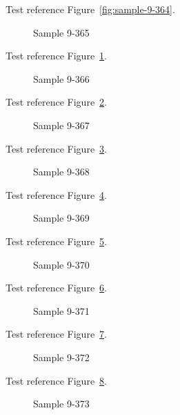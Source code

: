 Test reference Figure~\ref{fig:sample-9-364}.

\begin{figure}[tbhp]
\caption{Sample 9-365}
\label{fig:sample-9-365}
\end{figure}

Test reference Figure~\ref{fig:sample-9-365}.

\begin{figure}[tbhp]
\caption{Sample 9-366}
\label{fig:sample-9-366}
\end{figure}

Test reference Figure~\ref{fig:sample-9-366}.

\begin{figure}[tbhp]
\caption{Sample 9-367}
\label{fig:sample-9-367}
\end{figure}

Test reference Figure~\ref{fig:sample-9-367}.

\begin{figure}[tbhp]
\caption{Sample 9-368}
\label{fig:sample-9-368}
\end{figure}

Test reference Figure~\ref{fig:sample-9-368}.

\begin{figure}[tbhp]
\caption{Sample 9-369}
\label{fig:sample-9-369}
\end{figure}

Test reference Figure~\ref{fig:sample-9-369}.

\begin{figure}[tbhp]
\caption{Sample 9-370}
\label{fig:sample-9-370}
\end{figure}

Test reference Figure~\ref{fig:sample-9-370}.

\begin{figure}[tbhp]
\caption{Sample 9-371}
\label{fig:sample-9-371}
\end{figure}

Test reference Figure~\ref{fig:sample-9-371}.

\begin{figure}[tbhp]
\caption{Sample 9-372}
\label{fig:sample-9-372}
\end{figure}

Test reference Figure~\ref{fig:sample-9-372}.

\begin{figure}[tbhp]
\caption{Sample 9-373}
\label{fig:sample-9-373}
\end{figure}


